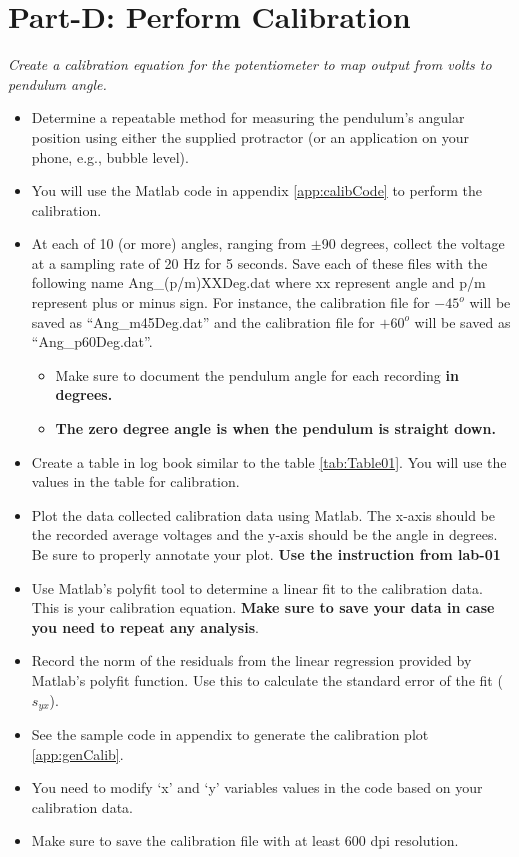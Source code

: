 \documentclass{article} %
\begin{document}
\section{Part-D: Perform Calibration}
\emph{Create a calibration equation for the potentiometer to map output from volts to pendulum angle.}
\begin{itemize}
\item Determine a repeatable method for measuring the pendulum's angular position using either the supplied protractor (or an application on your phone, e.g., bubble level).
\item You will use the Matlab code in appendix \ref{app:calibCode} to perform the calibration.  
\item At each of 10 (or more) angles, ranging from $\pm$90 degrees, collect the voltage at a sampling rate of 20 Hz for 5 seconds. Save each of these files with the following name Ang\_(p/m)XXDeg.dat where xx represent angle and p/m represent plus or minus sign. For instance, the calibration file for $-45^o$ will be saved as ``Ang\_m45Deg.dat'' and  the calibration file for $+60^o$ will be saved as ``Ang\_p60Deg.dat''.
\begin{itemize}
	\item Make sure to document the pendulum angle for each recording \bf{in degrees}.
	\item {\bf The zero degree angle is when the pendulum is straight down.}
\end{itemize}
\item Create a table in log book similar to the table \ref{tab:Table01}. You will use the values in the table for calibration.
\item Plot the data collected calibration data using Matlab. The x-axis should be the recorded average voltages and the y-axis should be the angle in degrees. Be sure to properly annotate your plot. \textbf{Use the instruction from lab-01}
\item Use Matlab’s polyfit tool to determine a linear fit to the calibration data. This is your calibration equation. \textbf {Make sure to save your data in case you need to repeat any analysis}.
\item Record the norm of the residuals from the linear regression provided by Matlab’s polyfit function. Use this to calculate the standard error of the fit ($s_{yx}$).
\item See the sample code in appendix to generate the calibration plot \ref{app:genCalib}.
\item You need to modify `x' and `y' variables values in the code based on your calibration data.
\item Make sure to save the calibration file with at least 600 dpi resolution.
\end{itemize}
\end{document}
